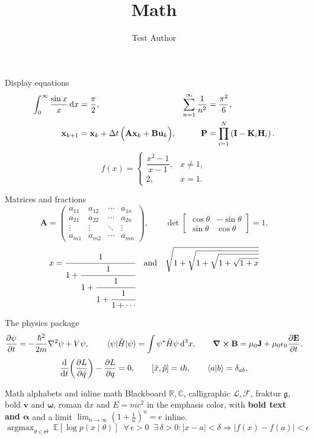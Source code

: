 \documentclass[aspectratio=169,10pt]{beamer}
\title{Math}
\author{Test Author}
\begin{document}
\begin{frame}{Display equations}
	\begin{align}
		\int_{0}^{\infty} \frac{\sin x}{x}\,\dd x &= \frac{\pi}{2}, &
		\sum_{n=1}^{\infty} \frac{1}{n^{2}} &= \frac{\pi^{2}}{6}, \\
		\mathbf{x}_{k+1} &= \mathbf{x}_k + \Delta t\,\Bigl(\mathbf{A}\mathbf{x}_k + \mathbf{B}\mathbf{u}_k\Bigr),
		& \mathbf{P} &= \prod_{i=1}^{N} \left(\mathbf{I} - \mathbf{K}_i \mathbf{H}_i\right).
	\end{align}
	\[
		f(x) = \begin{cases}
			\dfrac{x^{2}-1}{x-1}, & x \neq 1, \\[1ex]
			2, & x = 1.
		\end{cases}
	\]
\end{frame}

\begin{frame}{Matrices and fractions}
	\[
		\mathbf{A} = \begin{pmatrix} a_{11} & a_{12} & \cdots & a_{1n} \\ a_{21} & a_{22} & \cdots & a_{2n} \\ \vdots & \vdots & \ddots & \vdots \\ a_{m1} & a_{m2} & \cdots & a_{mn} \end{pmatrix},
		\qquad
		\det\begin{bmatrix} \cos\theta & -\sin\theta \\ \sin\theta & \cos\theta \end{bmatrix} = 1.
	\]
	\[
		x = \cfrac{1}{1+\cfrac{1}{1+\cfrac{1}{1+\cfrac{1}{1+\cdots}}}}
		\quad\text{and}\quad
		\sqrt{1+\sqrt{1+\sqrt{1+\sqrt{1+x}}}}
	\]
\end{frame}

\begin{frame}{The physics package}
	\[
		\pdv{\psi}{t} = -\frac{\hbar^2}{2m}\laplacian\psi + V\psi,
		\qquad
		\ev{\hat{H}}{\psi} = \int \psi^{*}\hat{H}\psi\,\dd^{3}x,
		\qquad
		\curl{\vb{B}} = \mu_0\vb{J} + \mu_0\epsilon_0\pdv{\vb{E}}{t}.
	\]
	\[
		\dv{}{t}\qty(\frac{\partial L}{\partial \dot{q}}) - \frac{\partial L}{\partial q} = 0,
		\qquad
		\comm{\hat{x}}{\hat{p}} = i\hbar,
		\qquad
		\bra{a}\ket{b} = \delta_{ab}.
	\]
\end{frame}

\begin{frame}{Math alphabets and inline math}
	Blackboard $\mathbb{R}, \mathbb{C}$, calligraphic $\mathcal{L}, \mathcal{F}$, fraktur $\mathfrak{g}$,
	bold $\mathbf{v}$ and $\boldsymbol{\omega}$, roman $\mathrm{d}x$ and \alert{$E = mc^{2}$} in the emphasis color,
	with \textbf{bold text and $\bm{\alpha}$} and a limit $\lim_{n\to\infty}\left(1+\tfrac{1}{n}\right)^{n} = e$ inline.
	\[
		\operatorname{argmax}_{\theta \in \Theta} \; \mathbb{E}\!\left[\log p(x \mid \theta)\right]
		\;\; \forall\, \epsilon > 0 \;\; \exists\, \delta > 0 : |x - a| < \delta \Rightarrow |f(x) - f(a)| < \epsilon
	\]
\end{frame}
\end{document}

